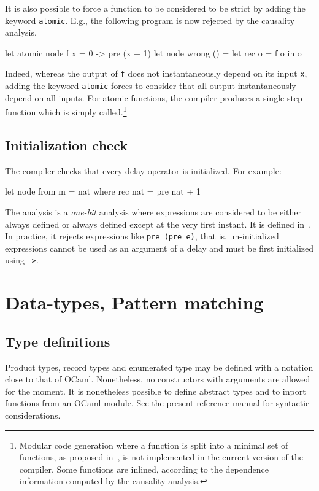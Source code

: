 \documentclass[11pt,titlepage,twoside]{report}
\newcommand{\ocaml}{{\sf OCaml}}
\begin{document}
It is also possible to force a function to be considered to be strict
by adding the keyword \texttt{atomic}. E.g., the following program is
now rejected by the causality analysis.
%
\begin{chklisting}
let atomic node f x = 0 -> pre (x + 1)
let node wrong () =
  let rec o = f o in o
\end{chklisting}
%
Indeed, whereas the output of \texttt{f} does not instantaneously
depend on its input \texttt{x}, adding the keyword \texttt{atomic}
forces to consider that all output instantaneously depend on all
inputs. For atomic functions, the compiler produces a single step
function which is simply called.\footnote{Modular code generation
  where a function is split into a minimal set of functions, as
  proposed in~\cite{lucy:emsoft09,lustre:tripakis-popl09}, is not
  implemented in the current version of the compiler. Some functions
  are inlined, according to the dependence information
  computed by the causality analysis.}

\subsection{Initialization check\label{initcheck}} %

The compiler checks that every delay operator is initialized. For
example:
\begin{chklisting}
let node from m = nat where
  rec nat = pre nat + 1
\end{chklisting}
The analysis is a {\em one-bit} analysis where expressions are
considered to be either always defined or always defined except at the
very first instant.  It is defined in~\cite{lucy:sttt04}. In
practice, it rejects expressions like \verb-pre (pre e)-, that is,
un-initialized expressions cannot be used as an argument of a delay
and must be first initialized using \verb+->+.

\section{Data-types, Pattern matching\label{dtypespatterns}} %
\subsection{Type definitions\label{typedef}} %

Product types, record types and enumerated type may be defined with a
notation close to that of \ocaml. Nonetheless, no constructors with
arguments are allowed for the moment. It is nonetheless possible to
define abstract types and to inport functions from an \ocaml{} module.
See the present reference manual for syntactic considerations.
\end{document}
